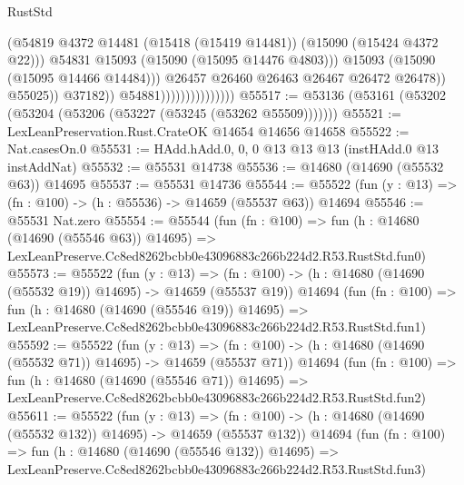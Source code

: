 \begin{lexlean}{RustStd}
\begin{coremodule}
                                                  (@54819
                                                    @4372
                                                    @14481
                                                    (@15418 (@15419 @14481))
                                                    (@15090 (@15424 @4372 @22)))
                                                  @54831
                                                  @15093
                                                  (@15090 (@15095 @14476 @4803)))
                                                @15093
                                                (@15090 (@15095 @14466 @14484)))
                                              @26457
                                              @26460
                                              @26463
                                              @26467
                                              @26472
                                              @26478))
                                          @55025))
                                      @37182))
                                  @54881)))))))))))))))
@55517 := @53136 (@53161 (@53202 (@53204 (@53206 (@53227 (@53245 (@53262 @55509)))))))
@55521 := LexLeanPreservation.Rust.CrateOK @14654 @14656 @14658
@55522 := Nat.casesOn.{0}
@55531 := HAdd.hAdd.{0, 0, 0} @13 @13 @13 (instHAdd.{0} @13 instAddNat)
@55532 := @55531 @14738
@55536 := @14680 (@14690 (@55532 @63)) @14695
@55537 := @55531 @14736
@55544 := @55522 (fun (y : @13) => (fn : @100) -> (h : @55536) -> @14659 (@55537 @63)) @14694
@55546 := @55531 Nat.zero
@55554 := @55544
    (fun (fn : @100) =>
    fun (h : @14680 (@14690 (@55546 @63)) @14695) =>
    LexLeanPreserve.Cc8ed8262bcbb0e43096883c266b224d2.R53.RustStd.fun0)
@55573 := @55522
    (fun (y : @13) =>
    (fn : @100) -> (h : @14680 (@14690 (@55532 @19)) @14695) -> @14659 (@55537 @19))
    @14694
    (fun (fn : @100) =>
    fun (h : @14680 (@14690 (@55546 @19)) @14695) =>
    LexLeanPreserve.Cc8ed8262bcbb0e43096883c266b224d2.R53.RustStd.fun1)
@55592 := @55522
    (fun (y : @13) =>
    (fn : @100) -> (h : @14680 (@14690 (@55532 @71)) @14695) -> @14659 (@55537 @71))
    @14694
    (fun (fn : @100) =>
    fun (h : @14680 (@14690 (@55546 @71)) @14695) =>
    LexLeanPreserve.Cc8ed8262bcbb0e43096883c266b224d2.R53.RustStd.fun2)
@55611 := @55522
    (fun (y : @13) =>
    (fn : @100) -> (h : @14680 (@14690 (@55532 @132)) @14695) -> @14659 (@55537 @132))
    @14694
    (fun (fn : @100) =>
    fun (h : @14680 (@14690 (@55546 @132)) @14695) =>
    LexLeanPreserve.Cc8ed8262bcbb0e43096883c266b224d2.R53.RustStd.fun3)

\end{coremodule}
\end{lexlean}
